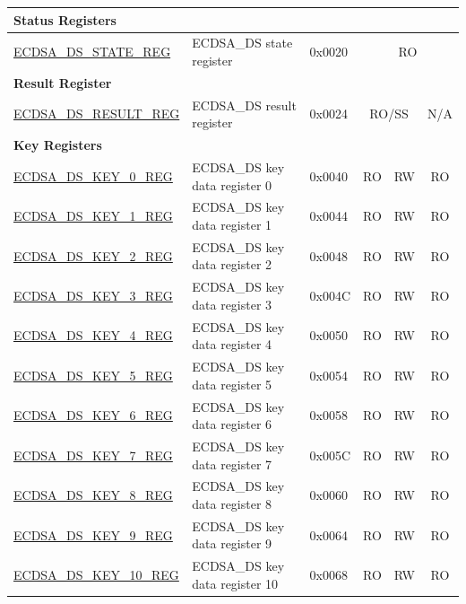 \begin{small}
\begin{longtable}{ | p{4.8cm} | l | p{1.2cm} | l | l | l | l | }
\multicolumn{7}{|l|}{\textbf{Status Registers}} \\ \hline
\hyperref[regdesc:ECDSADSSTATEREG]{ECDSA\_DS\_STATE\_REG} & ECDSA\_DS state register & 0x0020 & \multicolumn{4}{|c|}{RO} \\ \hline
\multicolumn{7}{|l|}{\textbf{Result Register}} \\ \hline
\hyperref[regdesc:ECDSADSRESULTREG]{ECDSA\_DS\_RESULT\_REG} & ECDSA\_DS result register & 0x0024 & \multicolumn{3}{|c|}{RO/SS} & N/A \\ \hline
\multicolumn{7}{|l|}{\textbf{Key Registers}} \\ \hline
\hyperref[regdesc:ECDSADSKEY0REG]{ECDSA\_DS\_KEY\_0\_REG} & ECDSA\_DS key data register 0 & 0x0040 & RO & RW &\multicolumn{2}{|c|}{RO} \\ \hline
\hyperref[regdesc:ECDSADSKEY1REG]{ECDSA\_DS\_KEY\_1\_REG} & ECDSA\_DS key data register 1 & 0x0044 & RO & RW &\multicolumn{2}{|c|}{RO}  \\ \hline
\hyperref[regdesc:ECDSADSKEY2REG]{ECDSA\_DS\_KEY\_2\_REG} & ECDSA\_DS key data register 2 & 0x0048 & RO & RW &\multicolumn{2}{|c|}{RO}  \\ \hline
\hyperref[regdesc:ECDSADSKEY3REG]{ECDSA\_DS\_KEY\_3\_REG} & ECDSA\_DS key data register 3 & 0x004C & RO & RW &\multicolumn{2}{|c|}{RO}  \\ \hline
\hyperref[regdesc:ECDSADSKEY4REG]{ECDSA\_DS\_KEY\_4\_REG} & ECDSA\_DS key data register 4 & 0x0050 & RO & RW &\multicolumn{2}{|c|}{RO}  \\ \hline
\hyperref[regdesc:ECDSADSKEY5REG]{ECDSA\_DS\_KEY\_5\_REG} & ECDSA\_DS key data register 5 & 0x0054 & RO & RW &\multicolumn{2}{|c|}{RO}  \\ \hline
\hyperref[regdesc:ECDSADSKEY6REG]{ECDSA\_DS\_KEY\_6\_REG} & ECDSA\_DS key data register 6 & 0x0058 & RO & RW &\multicolumn{2}{|c|}{RO}  \\ \hline
\hyperref[regdesc:ECDSADSKEY7REG]{ECDSA\_DS\_KEY\_7\_REG} & ECDSA\_DS key data register 7 & 0x005C & RO & RW &\multicolumn{2}{|c|}{RO}  \\ \hline
\hyperref[regdesc:ECDSADSKEY8REG]{ECDSA\_DS\_KEY\_8\_REG} & ECDSA\_DS key data register 8 & 0x0060 & RO & RW &\multicolumn{2}{|c|}{RO}  \\ \hline
\hyperref[regdesc:ECDSADSKEY9REG]{ECDSA\_DS\_KEY\_9\_REG} & ECDSA\_DS key data register 9 & 0x0064 & RO & RW &\multicolumn{2}{|c|}{RO}  \\ \hline
\hyperref[regdesc:ECDSADSKEY10REG]{ECDSA\_DS\_KEY\_10\_REG} & ECDSA\_DS key data register 10 & 0x0068 & RO & RW &\multicolumn{2}{|c|}{RO}  \\ \hline

\end{longtable}
\end{small}

